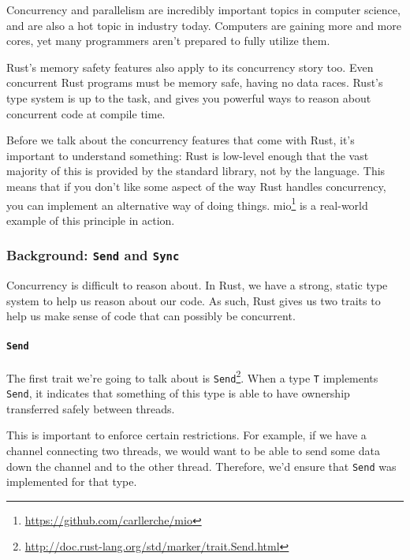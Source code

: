 \documentclass[a4paper,]{book}
\renewcommand{\href}[2]{#2\footnote{\url{#1}}}
\let\oldparagraph\paragraph
\renewcommand{\paragraph}[1]{\oldparagraph{#1}\mbox{}}
\begin{document}

Concurrency and parallelism are incredibly important topics in computer
science, and are also a hot topic in industry today. Computers are
gaining more and more cores, yet many programmers aren't prepared to
fully utilize them.

Rust's memory safety features also apply to its concurrency story too.
Even concurrent Rust programs must be memory safe, having no data races.
Rust's type system is up to the task, and gives you powerful ways to
reason about concurrent code at compile time.

Before we talk about the concurrency features that come with Rust, it's
important to understand something: Rust is low-level enough that the
vast majority of this is provided by the standard library, not by the
language. This means that if you don't like some aspect of the way Rust
handles concurrency, you can implement an alternative way of doing
things. \href{https://github.com/carllerche/mio}{mio} is a real-world
example of this principle in action.

\subsubsection{\texorpdfstring{Background: \texttt{Send} and
\texttt{Sync}}{Background: Send and Sync}}\label{background-send-and-sync}

Concurrency is difficult to reason about. In Rust, we have a strong,
static type system to help us reason about our code. As such, Rust gives
us two traits to help us make sense of code that can possibly be
concurrent.

\paragraph{\texorpdfstring{\texttt{Send}}{Send}}\label{send}

The first trait we're going to talk about is
\href{http://doc.rust-lang.org/std/marker/trait.Send.html}{\texttt{Send}}.
When a type \texttt{T} implements \texttt{Send}, it indicates that
something of this type is able to have ownership transferred safely
between threads.

This is important to enforce certain restrictions. For example, if we
have a channel connecting two threads, we would want to be able to send
some data down the channel and to the other thread. Therefore, we'd
ensure that \texttt{Send} was implemented for that type.
\end{document}
